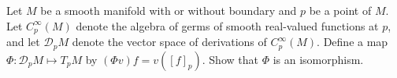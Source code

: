 Let $M$ be a smooth manifold with or without boundary and $p$ be a point of $M$.  Let $C^\infty_p(M)$ denote the algebra of germs of smooth real-valued functions at $p$, and let $\mathcal{D}_pM$ denote the vector space of derivations of $C_p^\infty(M)$.  Define a map $\Phi:\mathcal{D}_p M\mapsto T_p M$ by $(\Phi v)f = v([f]_p)$.  Show that $\Phi$ is an isomorphism.